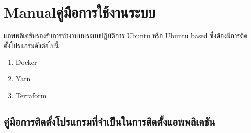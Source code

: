 





\ifenglish\else

\fi

\chapter{\ifenglish Manual\else คู่มือการใช้งานระบบ\fi}
แอพพลิเคชันรองรับการทำงานบนระบบปฏิบัติการ Ubuntu หรือ Ubuntu based ซึ่งต้องมีการติดตั้งโปรแกรมดังต่อไปนี้
\begin{enumerate}
  \item Docker
  \item Yarn
  \item Terraform
\end{enumerate}

\section{คู่มือการติดตั้งโปรแกรมที่จำเป็นในการติดตั้งแอพพลิเคชัน}
